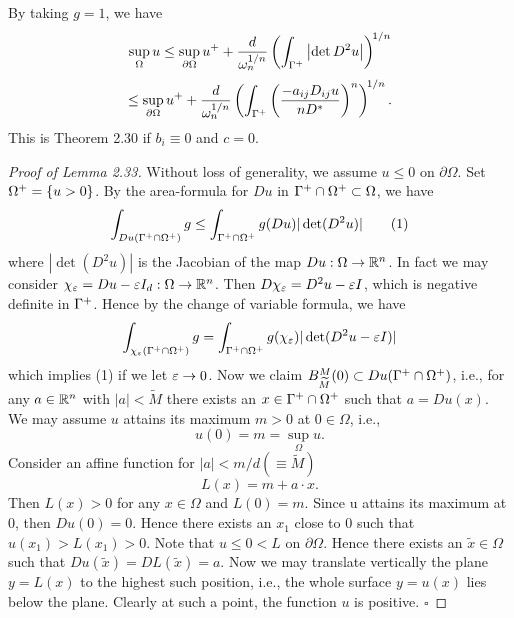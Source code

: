 \begin{remark}\label{hanlin:maxprin-remark-2-35}
By taking $g=1$, we have
\[
\sup_{\Omega} u \le \sup_{\partial\Omega} u^+ + \frac{d}{\omega_n^{1/n}}
\left(\int_{\Gamma^+} \left|\det D^2u\right|\right)^{\!1/n}
\]
\[
\le \sup_{\partial\Omega} u^+ + \frac{d}{\omega_n^{1/n}}
\left(\int_{\Gamma^+}\left(\frac{-a_{ij}D_{ij}u}{nD^*}\right)^n\right)^{\!1/n}.
\]
This is Theorem 2.30 if $b_i\equiv 0$ and $c=0$.
\end{remark}

\begin{proof}[Proof of Lemma 2.33]
\sketch
Without loss of generality, we assume $u\le 0$ on $\partial\Omega$.
Set $\Omega^+=\{u>0\}$. By the area-formula for $Du$ in $\Gamma^+\cap \Omega^+\subset \Omega$, we have
\begin{equation}
\int_{Du(\Gamma^+\cap\Omega^+)} g \le \int_{\Gamma^+\cap\Omega^+} g(Du)|\det(D^2u)|
\tag{1}
\end{equation}
where $|\det(D^2u)|$ is the Jacobian of the map $Du:\Omega\to\mathbb{R}^n$. In fact we may consider
$\chi_\varepsilon = Du-\varepsilon I_d:\Omega\to\mathbb{R}^n$. Then $D\chi_\varepsilon = D^2u-\varepsilon I$, which is negative definite in $\Gamma^+$.
Hence by the change of variable formula, we have
\[
\int_{\chi_\varepsilon(\Gamma^+\cap\Omega^+)} g=\int_{\Gamma^+\cap\Omega^+} g(\chi_\varepsilon)|\det(D^2u-\varepsilon I)|
\]
which implies (1) if we let $\varepsilon\to 0$.
Now we claim $B^M_{\widetilde{M}}(0)\subset Du(\Gamma^+\cap\Omega^+)$, i.e., for any $a\in\mathbb{R}^n$ with $|a|<\widetilde{M}$ there
exists an $x\in \Gamma^+\cap\Omega^+$ such that $a=Du(x)$. We may assume $u$ attains its maximum
$m>0$ at $0\in\Omega$, i.e.,
\[
u(0)=m=\sup_{\Omega}u.
\]
Consider an affine function for $|a|<m/d(\equiv \widetilde{M})$
\[
L(x)=m+a\cdot x.
\]
Then $L(x)>0$ for any $x\in\Omega$ and $L(0)=m$. Since u attains its maximum at $0$, then
$Du(0)=0$. Hence there exists an $x_1$ close to $0$ such that $u(x_1)>L(x_1)>0$. Note
that $u\le 0<L$ on $\partial\Omega$. Hence there exists an $\tilde{x}\in\Omega$ such that $Du(\tilde{x})=DL(\tilde{x})=a$.
Now we may translate vertically the plane $y=L(x)$ to the highest such position,
i.e., the whole surface $y=u(x)$ lies below the plane. Clearly at such a point, the
function $u$ is positive.
\hfill$\square$
\end{proof}

